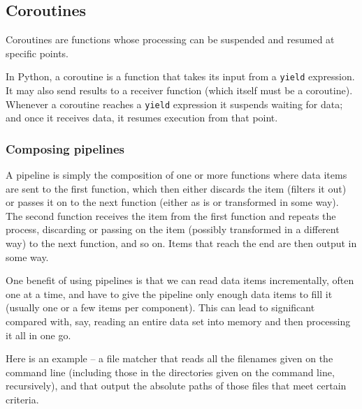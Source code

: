 \subsection{Coroutines}

Coroutines are functions whose processing can be suspended and resumed at specific points.


In Python, a coroutine is a function that takes its input from a \verb|yield| expression.
It may also send results to a receiver function (which itself must be a coroutine).
Whenever a coroutine reaches a \verb|yield| expression it suspends waiting for data; and once it receives data, it resumes execution from that point.


\subsubsection{Composing pipelines}

A pipeline is simply the composition of one or more functions where data items are sent to the first function, which then either discards the item (filters it out) or passes it on to the next function (either as is or transformed in some way).
The second function receives the item from the first function and repeats the process, discarding or passing on the item (possibly transformed in a different way) to the next function, and so on.
Items that reach the end are then output in some way.


\begin{tcolorbox}
One benefit of using pipelines is that we can read data items incrementally, often one at a time, and have to give the pipeline only enough data items to fill it (usually one or a few items per component).
This can lead to significant  compared with, say, reading an entire data set into memory and then processing it all in one go.  
\end{tcolorbox}



Here is an example -- a file matcher that reads all the filenames given on the command line (including those in the directories given on the command line, recursively), and that output the absolute paths of those files that meet certain criteria.





